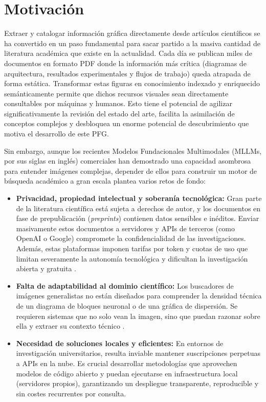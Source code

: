 \documentclass[a4paper]{report}
\begin{document}
\section{Motivación}

Extraer y catalogar información gráfica directamente desde artículos científicos se ha convertido en un paso fundamental para sacar partido a la masiva cantidad de literatura académica que existe en la actualidad. Cada día se publican miles de documentos en formato PDF donde la información más crítica (diagramas de arquitectura, resultados experimentales y flujos de trabajo) queda atrapada de forma estática. Transformar estas figuras en conocimiento indexado y enriquecido semánticamente permite que dichos recursos visuales sean directamente consultables por máquinas y humanos. Esto tiene el potencial de agilizar significativamente la revisión del estado del arte, facilita la asimilación de conceptos complejos y desbloquea un enorme potencial de descubrimiento que motiva el desarrollo de este PFG.

Sin embargo, aunque los recientes Modelos Fundacionales Multimodales (MLLMs, por sus siglas en inglés) comerciales han demostrado una capacidad asombrosa para entender imágenes complejas, depender de ellos para construir un motor de búsqueda académico a gran escala plantea varios retos de fondo:

\begin{itemize}
    \item \textbf{Privacidad, propiedad intelectual y soberanía tecnológica:} Gran parte de la literatura científica está sujeta a derechos de autor, y los documentos en fase de prepublicación (\textit{preprints}) contienen datos sensibles e inéditos. Enviar masivamente estos documentos a servidores y APIs de terceros (como OpenAI o Google) compromete la confidencialidad de las investigaciones. Además, estas plataformas imponen tarifas por token y cuotas de uso que limitan severamente la autonomía tecnológica y dificultan la investigación abierta y gratuita \cite{touvron2023}.
    
    \item \textbf{Falta de adaptabilidad al dominio científico:} Los buscadores de imágenes generalistas no están diseñados para comprender la densidad técnica de un diagrama de bloques neuronal o de una gráfica de dispersión. Se requieren sistemas que no solo vean la imagen, sino que puedan razonar sobre ella y extraer su contexto técnico \cite{yin2023}.
    
    \item \textbf{Necesidad de soluciones locales y eficientes:} En entornos de investigación universitarios, resulta inviable mantener suscripciones perpetuas a APIs en la nube. Es crucial desarrollar metodologías que aprovechen modelos de código abierto y puedan ejecutarse en infraestructura local (servidores propios), garantizando un despliegue transparente, reproducible y sin costes recurrentes por consulta.
\end{itemize}
\end{document}
